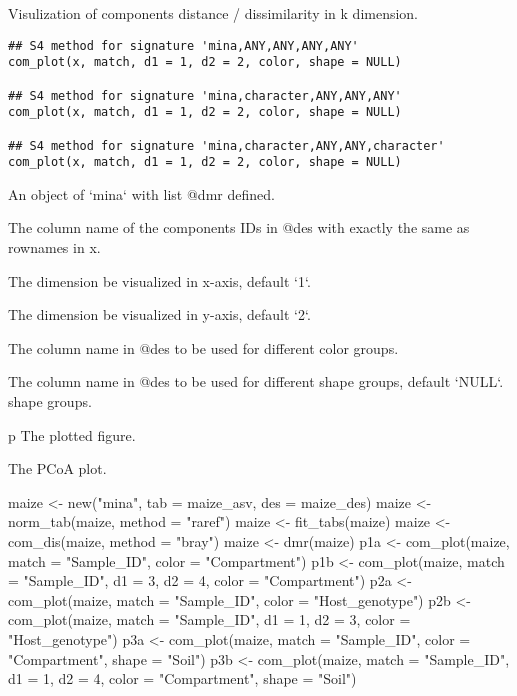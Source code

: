 \documentclass[a4paper]{book}
\begin{document}
%
\begin{Description}\relax
Visulization of components distance / dissimilarity in k dimension.
\end{Description}
%
\begin{Usage}
\begin{verbatim}
## S4 method for signature 'mina,ANY,ANY,ANY,ANY'
com_plot(x, match, d1 = 1, d2 = 2, color, shape = NULL)

## S4 method for signature 'mina,character,ANY,ANY,ANY'
com_plot(x, match, d1 = 1, d2 = 2, color, shape = NULL)

## S4 method for signature 'mina,character,ANY,ANY,character'
com_plot(x, match, d1 = 1, d2 = 2, color, shape = NULL)
\end{verbatim}
\end{Usage}
%
\begin{Arguments}
\begin{ldescription}
\item[\code{x}] An object of `mina` with list @dmr defined.

\item[\code{match}] The column name of the components IDs in @des with exactly the
same as rownames in x.

\item[\code{d1}] The dimension be visualized in x-axis, default `1`.

\item[\code{d2}] The dimension be visualized in y-axis, default `2`.

\item[\code{color}] The column name in @des to be used for different color groups.

\item[\code{shape}] The column name in @des to be used for different shape groups,
default `NULL`.
shape groups.
\end{ldescription}
\end{Arguments}
%
\begin{Value}
p The plotted figure.

The PCoA plot.
\end{Value}
%
\begin{Examples}
\begin{ExampleCode}
maize <- new("mina", tab = maize_asv, des = maize_des)
maize <- norm_tab(maize, method = "raref")
maize <- fit_tabs(maize)
maize <- com_dis(maize, method = "bray")
maize <- dmr(maize)
p1a <- com_plot(maize, match = "Sample_ID", color = "Compartment")
p1b <- com_plot(maize, match = "Sample_ID", d1 = 3, d2 = 4,
color = "Compartment")
p2a <- com_plot(maize, match = "Sample_ID", color = "Host_genotype")
p2b <- com_plot(maize, match = "Sample_ID", d1 = 1, d2 = 3, color =
"Host_genotype")
p3a <- com_plot(maize, match = "Sample_ID", color = "Compartment", shape =
"Soil")
p3b <- com_plot(maize, match = "Sample_ID", d1 = 1, d2 = 4, color =
"Compartment", shape = "Soil")
\end{ExampleCode}
\end{Examples}
\end{document}
